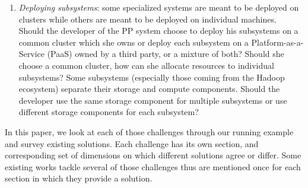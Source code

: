 \begin{enumerate}
\item{\emph{Deploying subsystems}: some specialized systems are meant to be deployed on clusters while others are meant to be deployed on individual machines. Should the developer of the PP system choose to deploy his subsystems on a common cluster which she owns or deploy each subsystem on a Platform-as-a-Service (PaaS) owned by a third party, or a mixture of both? Should she choose a common cluster, how can she allocate resources to individual subsystems? Some subsystems (especially those coming from the Hadoop ~\cite{Shvachko2010} ecosystem) separate their storage and compute components. Should the developer use the same storage component for multiple subsystems or use different storage components for each subsystem?}
\end{enumerate}

In this paper, we look at each of those challenges through our running example and survey existing solutions. Each challenge has its own section, and corresponding set of dimensions on which different solutions agree or differ. Some existing works tackle several of those challenges thus are mentioned once for each section in which they provide a solution. 

